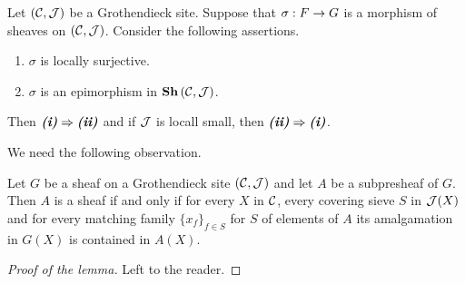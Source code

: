 \begin{theorem}\label{theorem:epimorphismsinthecategoryofsheaves}
Let $({\mathcal C},{\mathcal J})$ be a Grothendieck site. Suppose that $\sigma:F\rightarrow G$ is a morphism of sheaves on $\left({\mathcal C},{\mathcal J}\right)$. Consider the following assertions.
\begin{enumerate}[label=\emph{\textbf{(\roman*)}}, leftmargin=3.0em]
\item $\sigma$ is locally surjective.
\item $\sigma$ is an epimorphism in $\mathbf{Sh}\left({\mathcal C},{\mathcal J}\right)$.
\end{enumerate}
Then $\emph{\textbf{(i)}}\Rightarrow \emph{\textbf{(ii)}}$ and if ${\mathcal J}$ is locall small, then $\emph{\textbf{(ii)}}\Rightarrow \emph{\textbf{(i)}}$.
\end{theorem}
\noindent
We need the following observation.

\begin{lemma}\label{lemma:sheafcriterionforsubpresheaves}
Let $G$ be a sheaf on a Grothendieck site $({\mathcal C},{\mathcal J})$ and let $A$ be a subpresheaf of $G$. Then $A$ is a sheaf if and only if for every $X$ in ${\mathcal C}$, every covering sieve $S$ in ${\mathcal J}(X)$ and for every matching family $\{x_f\}_{f\in S}$ for $S$ of elements of $A$ its amalgamation in $G(X)$ is contained in $A(X)$.
\end{lemma}
\begin{proof}[Proof of the lemma]
Left to the reader.
\end{proof}

